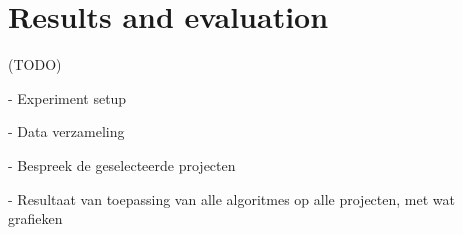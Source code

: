 \chapter{Results and evaluation}
(TODO)

- Experiment setup

  -  Data verzameling

  - Bespreek de geselecteerde projecten
  
- Resultaat van toepassing van alle algoritmes op alle projecten, met wat grafieken